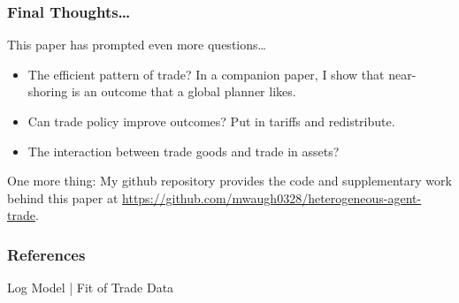 \documentclass[9pt,pdftex,aspectratio=1610]{beamer}
\theoremstyle{definition}
\begin{document}

\begin{frame}[t]
\frametitle{Final Thoughts\ldots}
\smallskip
This paper has prompted even more questions\ldots
\begin{itemize}
\smallskip
\item The efficient pattern of trade? In a companion paper, I show that near-shoring is an outcome that a global planner likes.
\smallskip
\item Can trade policy improve outcomes? Put in tariffs and redistribute.
\smallskip
\item The interaction between trade goods and trade in assets?
\end{itemize}
\medskip
\bigskip
One more thing: My github repository provides the code and supplementary work behind this paper at \url{https://github.com/mwaugh0328/heterogeneous-agent-trade}.

\end{frame}



\appendix

\setcounter{finalframe}{\value{framenumber}}

\begin{frame}[allowframebreaks]
\frametitle{References}
\scriptsize

\end{frame}


\begin{frame}[t]{Log Model | Fit of Trade Data}
\begin{figure}[!t]
\end{figure}
\end{frame}
\end{document}
